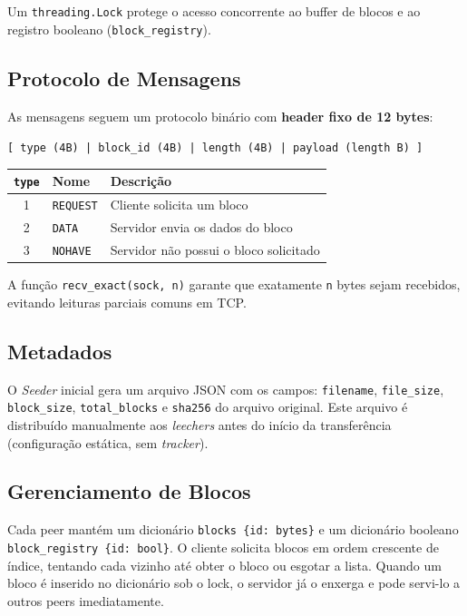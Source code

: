 \documentclass[12pt,a4paper]{article}
\begin{document}
Um \texttt{threading.Lock} protege o acesso concorrente ao buffer de blocos
e ao registro booleano (\texttt{block\_registry}).

\subsection{Protocolo de Mensagens}

As mensagens seguem um protocolo binário com \textbf{header fixo de 12 bytes}:

\begin{center}
\texttt{[ type (4B) | block\_id (4B) | length (4B) | payload (length B) ]}
\end{center}

\begin{tabular}{cll}
\toprule
\texttt{type} & Nome & Descrição \\
\midrule
1 & \texttt{REQUEST} & Cliente solicita um bloco \\
2 & \texttt{DATA}    & Servidor envia os dados do bloco \\
3 & \texttt{NOHAVE}  & Servidor não possui o bloco solicitado \\
\bottomrule
\end{tabular}

\vspace{6pt}
A função \texttt{recv\_exact(sock, n)} garante que exatamente \texttt{n} bytes
sejam recebidos, evitando leituras parciais comuns em TCP.

\subsection{Metadados}

O \emph{Seeder} inicial gera um arquivo JSON com os campos:
\texttt{filename}, \texttt{file\_size}, \texttt{block\_size},
\texttt{total\_blocks} e \texttt{sha256} do arquivo original.
Este arquivo é distribuído manualmente aos \emph{leechers} antes do início
da transferência (configuração estática, sem \emph{tracker}).

\subsection{Gerenciamento de Blocos}

Cada peer mantém um dicionário \texttt{blocks \{id: bytes\}} e um
dicionário booleano \texttt{block\_registry \{id: bool\}}.
O cliente solicita blocos em ordem crescente de índice, tentando cada
vizinho até obter o bloco ou esgotar a lista.
Quando um bloco é inserido no dicionário sob o lock, o servidor já o
enxerga e pode servi-lo a outros peers imediatamente.
\end{document}
